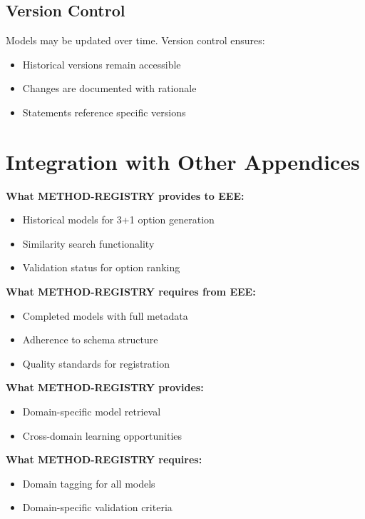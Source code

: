 \subsection{Version Control}

Models may be updated over time. Version control ensures:
\begin{itemize}
\item Historical versions remain accessible
\item Changes are documented with rationale
\item Statements reference specific versions
\end{itemize}


\section{Integration with Other Appendices}
\label{sec:fff-integration}

\begin{tcolorbox}[colback=yellow!5!white, colframe=yellow!75!black,
    title=Integration: METHOD-REGISTRY $\leftrightarrow$ METHOD-DESIGN (EEE)]
\textbf{What METHOD-REGISTRY provides to EEE:}
\begin{itemize}[nosep]
\item Historical models for 3+1 option generation
\item Similarity search functionality
\item Validation status for option ranking
\end{itemize}

\textbf{What METHOD-REGISTRY requires from EEE:}
\begin{itemize}[nosep]
\item Completed models with full metadata
\item Adherence to schema structure
\item Quality standards for registration
\end{itemize}
\end{tcolorbox}

\begin{tcolorbox}[colback=yellow!5!white, colframe=yellow!75!black,
    title=Integration: METHOD-REGISTRY $\leftrightarrow$ DOMAIN Appendices]
\textbf{What METHOD-REGISTRY provides:}
\begin{itemize}[nosep]
\item Domain-specific model retrieval
\item Cross-domain learning opportunities
\end{itemize}

\textbf{What METHOD-REGISTRY requires:}
\begin{itemize}[nosep]
\item Domain tagging for all models
\item Domain-specific validation criteria
\end{itemize}
\end{tcolorbox}


